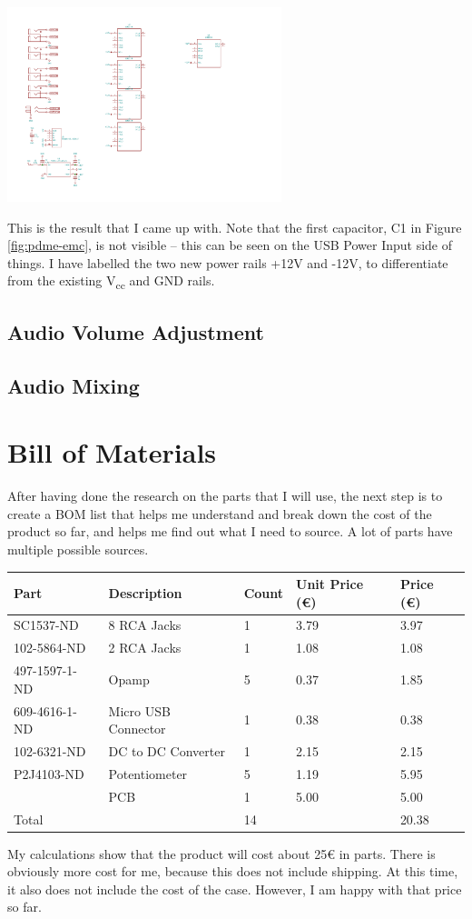 \documentclass[a4paper]{article}
\begin{document}
\begin{center}
  \includegraphics[trim={2cm 1.5cm 21cm 16cm},width=8cm,clip]{images/audio-mixer.pdf}
\end{center}

This is the result that I came up with. Note that the first capacitor, C1 in Figure \ref{fig:pdme-emc}, is not visible -- this can be seen on the USB Power Input side of things. I have labelled the two new power rails +12V and -12V, to differentiate from the existing V\textsubscript{cc} and GND rails.

\subsection{Audio Volume Adjustment}

\subsection{Audio Mixing}


\section{Bill of Materials}

After having done the research on the parts that I will use, the next step is to create a BOM list that helps me understand and break down the cost of the product so far, and helps me find out what I need to source. A lot of parts have multiple possible sources.

\begin{table}[h!]
\centering
\begin{tabular}{@{}lllll@{}}
\toprule
Part & Description & Count & Unit Price (€) & Price (€)\\
\midrule
SC1537-ND & 8 RCA Jacks & 1 & 3.79 & 3.97\\
102-5864-ND & 2 RCA Jacks & 1 & 1.08 & 1.08\\
497-1597-1-ND & Opamp & 5 & 0.37 & 1.85\\
609-4616-1-ND & Micro USB Connector & 1 & 0.38 & 0.38\\
102-6321-ND & DC to DC Converter & 1 & 2.15 & 2.15\\
P2J4103-ND & Potentiometer & 5 & 1.19 & 5.95\\
& PCB & 1 & 5.00 & 5.00\\
\midrule
Total & & 14 && 20.38\\
\bottomrule
\end{tabular}
\end{table}

My calculations show that the product will cost about 25€ in parts. There is obviously more cost for me, because this does not include shipping. At this time, it also does not include the cost of the case. However, I am happy with that price so far. 
\end{document}
